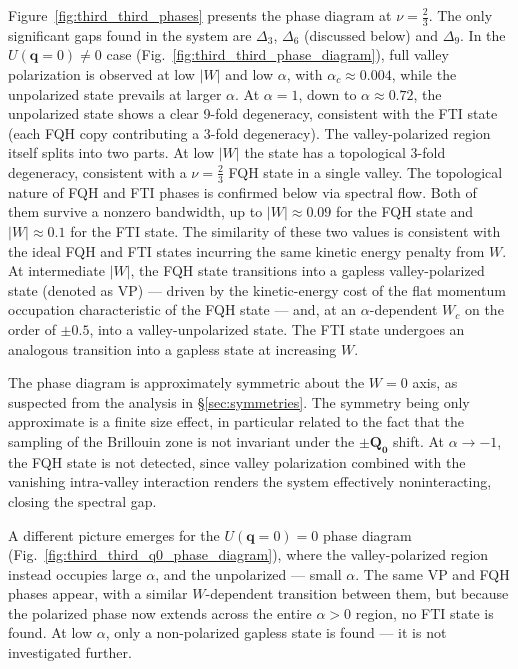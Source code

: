 Figure~\ref{fig:third_third_phases} presents the phase diagram at $\nu=\frac{2}{3}$. The only significant gaps found in the system are $\Delta_3$, $\Delta_6$ (discussed below) and $\Delta_9$. In the $U(\mathbf{q}=0) \neq 0$ case (Fig.~\ref{fig:third_third_phase_diagram}), full valley polarization is observed at low $|W|$ and low $\alpha$, with $\alpha_c \approx 0.004$, while the unpolarized state prevails at larger $\alpha$. At $\alpha=1$, down to $\alpha \approx 0.72$, the unpolarized state shows a clear 9-fold degeneracy, consistent with the FTI state (each FQH copy contributing a 3-fold degeneracy). The valley-polarized region itself splits into two parts. At low $|W|$ the state has a topological 3-fold degeneracy, consistent with a $\nu=\frac{2}{3}$ FQH state in a single valley. The topological nature of FQH and FTI phases is confirmed below via spectral flow. Both of them survive a nonzero bandwidth, up to $|W| \approx 0.09$ for the FQH state and $|W| \approx 0.1$ for the FTI state. The similarity of these two values is consistent with the ideal FQH and FTI states incurring the same kinetic energy penalty from $W$. At intermediate $|W|$, the FQH state transitions into a gapless valley-polarized state (denoted as VP) --- driven by the kinetic-energy cost of the flat momentum occupation characteristic of the FQH state --- and, at an $\alpha$-dependent $W_c$ on the order of $\pm0.5$, into a valley-unpolarized state. The FTI state undergoes an analogous transition into a gapless state at increasing $W$.

The phase diagram is approximately symmetric about the $W=0$ axis, as suspected from the analysis in \S\ref{sec:symmetries}. The symmetry being only approximate is a finite size effect, in particular related to the fact that the sampling of the Brillouin zone is not invariant under the $\pm \mathbf{Q_0}$ shift. At $\alpha \to -1$, the FQH state is not detected, since valley polarization combined with the vanishing intra-valley interaction renders the system effectively noninteracting, closing the spectral gap.

A different picture emerges for the $U(\mathbf{q}=0) = 0$ phase diagram (Fig.~\ref{fig:third_third_q0_phase_diagram}), where the valley-polarized region instead occupies large $\alpha$, and the unpolarized --- small $\alpha$. The same VP and FQH phases appear, with a similar $W$-dependent transition between them, but because the polarized phase now extends across the entire $\alpha > 0$ region, no FTI state is found. At low $\alpha$, only a non-polarized gapless state is found --- it is not investigated further.


